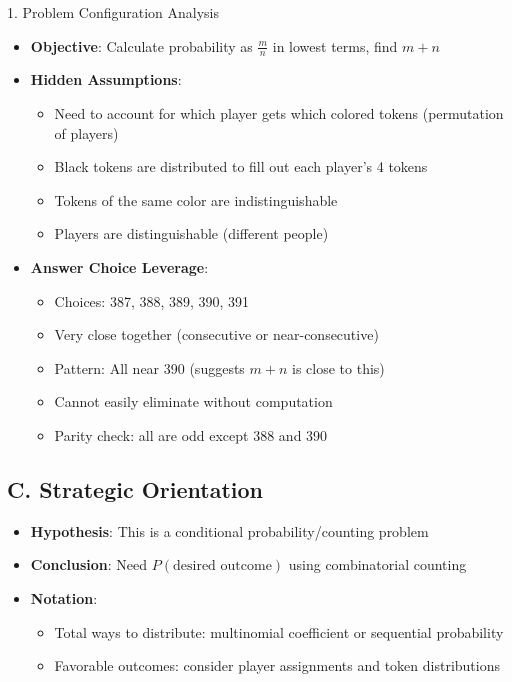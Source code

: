 \documentclass[12pt]{article}
\begin{document}
\begin{configbox}{1. Problem Configuration Analysis}
\begin{itemize}[leftmargin=*]
    \item \textbf{Objective}: Calculate probability as $\frac{m}{n}$ in lowest terms, find $m+n$
    
    \item \textbf{Hidden Assumptions}: 
    \begin{itemize}
        \item Need to account for which player gets which colored tokens (permutation of players)
        \item Black tokens are distributed to fill out each player's 4 tokens
        \item Tokens of the same color are indistinguishable
        \item Players are distinguishable (different people)
    \end{itemize}
    
    \item \textbf{Answer Choice Leverage}: 
    \begin{itemize}
        \item Choices: 387, 388, 389, 390, 391
        \item Very close together (consecutive or near-consecutive)
        \item Pattern: All near 390 (suggests $m+n$ is close to this)
        \item Cannot easily eliminate without computation
        \item Parity check: all are odd except 388 and 390
    \end{itemize}
\end{itemize}

\subsection*{C. Strategic Orientation}
\begin{itemize}[leftmargin=*]
    \item \textbf{Hypothesis}: This is a conditional probability/counting problem
    
    \item \textbf{Conclusion}: Need $P(\text{desired outcome})$ using combinatorial counting
    
    \item \textbf{Notation}: 
    \begin{itemize}
        \item Total ways to distribute: multinomial coefficient or sequential probability
        \item Favorable outcomes: consider player assignments and token distributions
    \end{itemize}
    

\end{itemize}
\end{configbox}
\end{document}
